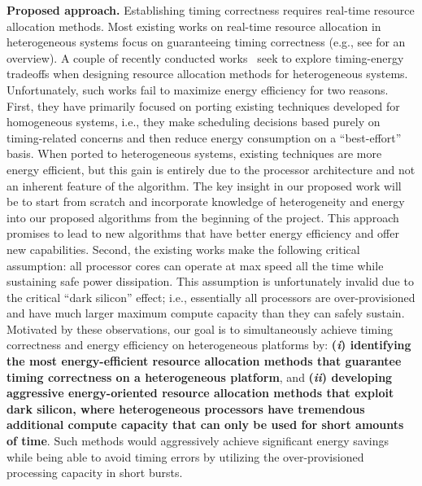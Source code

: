 \vspace{2mm} \noindent \textbf{Proposed approach.} Establishing timing correctness requires real-time resource allocation methods. Most existing works on real-time resource allocation in heterogeneous systems focus on guaranteeing timing correctness (e.g., see \cite{raravi2014task, raravi2013assigning, niemeier2011partitioned} for an overview). %
 A couple of recently conducted works~\cite{liuenergy, colin2014energy} seek to explore timing-energy tradeoffs when designing resource allocation methods for heterogeneous systems. 
 Unfortunately, such works fail to maximize energy efficiency for two reasons. First, they have primarily focused on porting existing techniques developed for homogeneous systems, i.e., they make scheduling decisions based purely on timing-related concerns and then reduce energy consumption on a ``best-effort'' basis. 
 When ported to heterogeneous systems, existing techniques are more energy efficient, but this gain is entirely due to the processor architecture and not an inherent feature of the algorithm. The key insight in our proposed
work will be to start from scratch and incorporate knowledge of heterogeneity and energy into our proposed algorithms from the beginning of the project.  This approach promises to lead to new algorithms that have better energy efficiency and offer new capabilities. Second, the existing works make the following critical assumption: all processor cores can operate at max speed all the time while sustaining safe power dissipation.
  This assumption is unfortunately invalid due to the critical ``dark silicon'' effect; i.e., essentially all processors are over-provisioned and have much larger maximum compute capacity than they can safely sustain\cite{?}. Motivated by these observations, our goal is to simultaneously achieve timing correctness and energy efficiency on heterogeneous platforms by: \textbf{(\textit{i}) identifying the most energy-efficient resource allocation methods that guarantee timing correctness on a heterogeneous platform}, and
   \textbf{(\textit{ii}) developing aggressive energy-oriented resource allocation methods that exploit dark silicon, where heterogeneous processors have tremendous additional compute capacity that can only be used for short amounts of time}. Such methods would aggressively achieve significant energy savings while being able to avoid timing errors by utilizing the over-provisioned processing capacity in short bursts.



